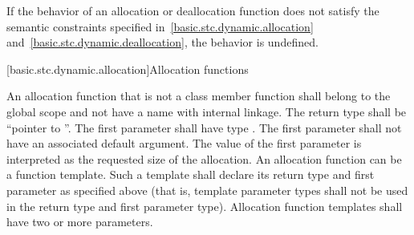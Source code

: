 \pnum
If the behavior of an allocation or deallocation function
does not satisfy the semantic constraints
specified in~\ref{basic.stc.dynamic.allocation}
and~\ref{basic.stc.dynamic.deallocation},
the behavior is undefined.
%
%
%
%
%


[basic.stc.dynamic.allocation]{Allocation functions}

\pnum
{}%
An allocation function that is not a class member function
shall belong to the global scope and not have a name with internal linkage.
The return type shall be ``pointer to ''. The first
parameter shall have type . The
first parameter shall not have an associated default
argument. The value of the first parameter
is interpreted as the requested size of the allocation. An allocation
function can be a function template. Such a template shall declare its
return type and first parameter as specified above (that is, template
parameter types shall not be used in the return type and first parameter
type). Allocation function templates shall have two or more parameters.

